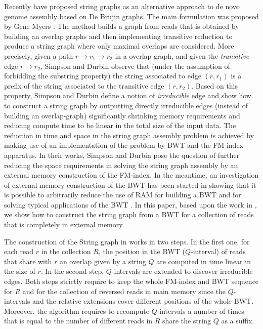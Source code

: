 \documentclass[runningheads,envcountsame,a4paper]{llncs}
\begin{document}
Recently \cite{Simpson2010, Simpson2013}  have proposed string graphs as an alternative approach to de novo  genome assembly based on De Brujin graphs. The main  formulation was proposed by Gene Myers \cite{Myers05}.  The method builds a graph from reads that  is obtained by   building an overlap graphs and  then implementing transitive reduction to produce a string graph where only maximal  overlaps are considered. More precisely, given a path $r \rightarrow r_1 \rightarrow r_2$ in a overlap graph,  and given the \emph{transitive} edge  $r \rightarrow r_2$, Simpson and Durbin \cite{Simpson10}  observe that  (under the assumption of forbidding the substring property)  the string associated to edge   $(r, r_1) $  is a prefix of  the string associated to the transitive edge $(r, r_2)$.
Based on this property,  Simpson and Durbin \cite{Simpson10}  define a notion of \emph{irreducible} edge  and    show  how to construct a string graph by outputting  directly  irreducible edges (instead of building an overlap-graph)  significantly shrinking memory
requirements and reducing compute time to be linear in the total size of the input data.  The   reduction in time and space in the string graph assembly problem  \cite{Simpson10}  is achieved by    making use of  an implementation  of the problem by BWT and the FM-index apparatus.
In their works, Simpson and Durbin pose the question of further reducing the space requirements in solving the string graph assembly by an external memory construction of the FM-index.
In the meantime, an investigation of external memory construction of the  BWT  has been started in \cite{Rosone...} showing that it is possible to  arbitrarily reduce the use of RAM for building a BWT and for solving  typical applications of the BWT  \cite{}.
In this paper, based upon the work in \cite{Rosone}, we show how to construct the string graph from a BWT for a collection of reads  that is completely in external memory.

The construction of the String graph in \cite{Simpson10} works in two steps. In the first one,  for each read $r$ in the collection $R$,  the position in the BWT  ($Q$-interval)  of reads  that share with $r$ an overlap  given by a string $Q$  are computed
in time linear in the size of  $r$.  In the second step,  $Q$-intervals are extended to discover  irreducible edges.
Both   steps strictly require to keep the  whole FM-index and BWT sequence for $R$ and  for the collection of reversed reads  in main memory since the $Q$-intervals and the relative extensions cover different positions of  the whole BWT. Moreover, the algorithm requires to recompute   $Q$-intervals  a number of times that is equal to the number of  different reads in $R$ share the string  $Q$
as a suffix.
\end{document}
